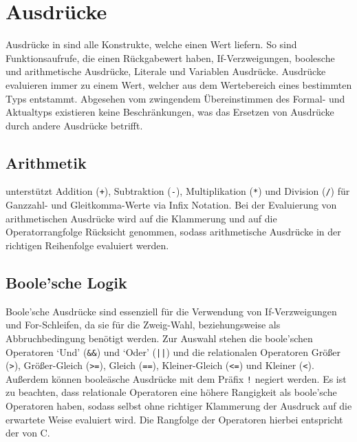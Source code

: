 \section{Ausdrücke}

Ausdrücke in \toya sind alle Konstrukte, welche einen Wert liefern. So sind Funktionsaufrufe, die einen Rückgabewert haben, If-Verzweigungen, boolesche und arithmetische Ausdrücke, Literale und Variablen Ausdrücke. Ausdrücke evaluieren immer zu einem Wert, welcher aus dem Wertebereich eines bestimmten Typs entstammt. Abgesehen vom zwingendem Übereinstimmen des Formal- und Aktualtyps existieren keine Beschränkungen, was das Ersetzen von Ausdrücke durch andere Ausdrücke betrifft.

\subsection{Arithmetik}

\toya unterstützt Addition (\texttt{+}), Subtraktion (\texttt{-}), Multiplikation (\texttt{*}) und Division (\texttt{/}) für Ganzzahl- und Gleitkomma-Werte via Infix Notation. Bei der Evaluierung von arithmetischen Ausdrücke wird auf die Klammerung und auf die Operatorrangfolge Rücksicht genommen, sodass arithmetische Ausdrücke in der richtigen Reihenfolge evaluiert werden. 


\subsection{Boole'sche Logik}

Boole'sche Ausdrücke sind essenziell für die Verwendung von If-Verzweigungen und For-Schleifen, da sie für die Zweig-Wahl, beziehungsweise als Abbruchbedingung benötigt werden. Zur Auswahl stehen die boole'schen Operatoren `Und' (\texttt{\&\&}) und `Oder' (\texttt{||}) und die relationalen Operatoren Größer (\texttt{>}), Größer-Gleich (\texttt{>=}), Gleich (\texttt{==}), Kleiner-Gleich (\texttt{<=}) und Kleiner (\texttt{<}). Außerdem können booleäsche Ausdrücke mit dem Präfix \texttt{!} negiert werden. Es ist zu beachten, dass relationale Operatoren eine höhere Rangigkeit als boole'sche Operatoren haben, sodass selbst ohne richtiger Klammerung der Ausdruck auf die erwartete Weise evaluiert wird. Die Rangfolge der Operatoren hierbei entspricht der von C.


